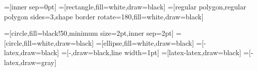 \usepackage[utf8]{inputenc}
\usepackage{hyperref}
\usepackage{parskip}
\usepackage{rotating}
\usepackage{tikz}
\usetikzlibrary{cd}
\usetikzlibrary{decorations.markings}
\usetikzlibrary{shapes.geometric}
\usetikzlibrary{shadows}
\newlength{\imagewidth}
\newlength{\imagescale}
=[inner sep=0pt]
=[rectangle,fill=white,draw=black]
=[regular polygon,regular polygon sides=3,shape border
rotate=180,fill=white,draw=black]

=[circle,fill=black!50,minimum size=2pt,inner sep=2pt] 
=[circle,fill=white,draw=black]
=[ellipse,fill=white,draw=black]
=[-latex,draw=black]
=[-,draw=black,line width=1pt]
=[latex-latex,draw=black]
=[-latex,draw=gray]

\newtheorem{corollary}{Corollary}[section]
\newtheorem{definition}{Definition}[section]
\newtheorem{example}{Example}[section]
\newtheorem{exercise}{Exercise}[section]
\newtheorem{lemma}{Lemma}[section]
\newtheorem{maintheorem}{Main Theorem}[section]
\newtheorem{theorem}{Theorem}[section]

\newcommand{\missingfigure}{\begin{center}\fbox{A figure is missing
here!}\end{center}}

\newcommand{\alglang}{\bf ALG}
\newcommand{\card}[1]{\mathrm{card}({#1})}
\newcommand{\cflang}{\mbox{{\bf CF}}}
\newcommand{\dderives}[1]{\underset{#1}{\Rightarrow}}
\newcommand{\derives}[1]{\underset{{#1}}{\overset{*}{\Rightarrow}}}
\newcommand{\edge}[1]{\xrightarrow{\ {#1}\ }}
\newcommand{\faequiv}[1]{\underset{\fa{#1}}{\equiv}}
\newcommand{\fa}[1]{\mbox{$\mathfrak{#1}$}}
\newcommand{\genbyone}[1]{\mbox{${<}{#1}{>}$}}
\newcommand{\genby}[2]{\mbox{${<}{#1},{#2}{>}$}}
\newcommand{\hgroup}[1]{\mbox{${#1}^{[*]}$}}
\newcommand{\inv}[1]{{{#1}^{-1}}}
\newcommand{\lang}[1]{\mbox{$L_{\mathfrak{#1}}$}}
\newcommand{\len}[1]{\mathrm{length}({#1})}
\newcommand{\llinlang}{\mbox{{\bf l-LIN}}}
\newcommand{\pathcat}[1]{\mbox{$\mathfrak{W}({#1})$}}
\newcommand{\pocymon}[1]{\mbox{${#1}^{(*)}$}}
\newcommand{\powset}[1]{\mathfrak{P}({#1})}
\newcommand{\pathprefix}{\overset{\tilde}{<}}
\newcommand{\production}[1]{\xrightarrow{{#1}}}
\newcommand{\prefix}{\prec}
\newcommand{\proj}[1]{\mathbf{p}({#1})}
\newcommand{\ratlang}{\mbox{{\bf RAT}}}
\newcommand{\reclang}{\mbox{{\bf REC}}}
\newcommand{\reglang}{\mbox{{\bf REG}}}
\newcommand{\rlinlang}{\mbox{{\bf r-LIN}}}
\newcommand{\setof}[1]{\mbox{$\{#1\}$}}
\newcommand{\store}[1]{\mbox{$\mathcal{#1}$}}
\newcommand{\unioninv}[1]{#1 \cup {#1}^{-1}}
